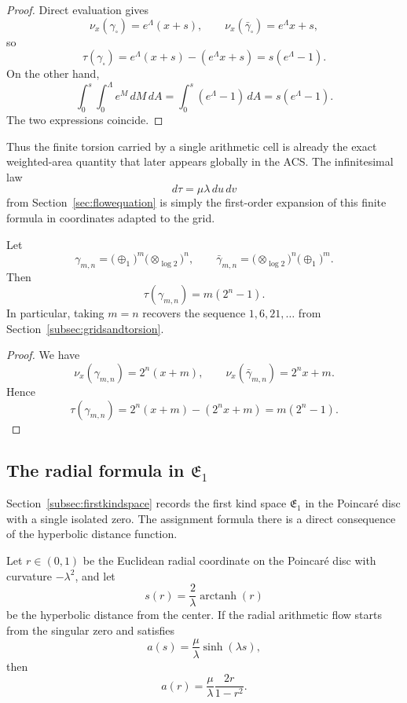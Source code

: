 \begin{proof}
Direct evaluation gives
\[
\nu_x(\gamma_{\square})=e^{\Lambda}(x+s),
\qquad
\nu_x(\bar\gamma_{\square})=e^{\Lambda}x+s,
\]
so
\[
\tau(\gamma_{\square})
 =e^{\Lambda}(x+s)-(e^{\Lambda}x+s)
 =s(e^{\Lambda}-1).
\]
On the other hand,
\[
\int_0^s\int_0^{\Lambda} e^M\,dM\,dA
 =\int_0^s (e^{\Lambda}-1)\,dA
 =s(e^{\Lambda}-1).
\]
The two expressions coincide.
\end{proof}

Thus the finite torsion carried by a single arithmetic cell is already the exact weighted-area quantity that later appears globally in the ACS. The infinitesimal law
\[
 d\tau = \mu\lambda\,du\,dv
\]
from Section~\ref{sec:flowequation} is simply the first-order expansion of this finite formula in coordinates adapted to the grid.

\begin{corollary}
\label{cor:appC-rectangular-family}
Let
\[
\gamma_{m,n}=\bigl(\oplus_1\bigr)^m\bigl(\otimes_{\log 2}\bigr)^n,
\qquad
\bar\gamma_{m,n}=\bigl(\otimes_{\log 2}\bigr)^n\bigl(\oplus_1\bigr)^m.
\]
Then
\[
\tau(\gamma_{m,n})=m(2^n-1).
\]
In particular, taking $m=n$ recovers the sequence $1,6,21,\dots$ from Section~\ref{subsec:gridsandtorsion}.
\end{corollary}

\begin{proof}
We have
\[
\nu_x(\gamma_{m,n})=2^n(x+m),
\qquad
\nu_x(\bar\gamma_{m,n})=2^n x+m.
\]
Hence
\[
\tau(\gamma_{m,n})=2^n(x+m)-(2^n x+m)=m(2^n-1).
\]
\end{proof}

\subsection{The radial formula in \texorpdfstring{$\mathfrak{E}_1$}{E1}}
\label{appC:first-kind-radial}

Section~\ref{subsec:firstkindspace} records the first kind space $\mathfrak{E}_1$ in the Poincar\'e disc with a single isolated zero. The assignment formula there is a direct consequence of the hyperbolic distance function.

\begin{lemma}
\label{lem:appC-radial-formula}
Let $r\in(0,1)$ be the Euclidean radial coordinate on the Poincar\'e disc with curvature $-\lambda^2$, and let
\[
 s(r)=\frac{2}{\lambda}\operatorname{arctanh}(r)
\]
be the hyperbolic distance from the center. If the radial arithmetic flow starts from the singular zero and satisfies
\[
 a(s)=\frac{\mu}{\lambda}\sinh(\lambda s),
\]
then
\[
 a(r)=\frac{\mu}{\lambda}\frac{2r}{1-r^2}.
\]
\end{lemma}

